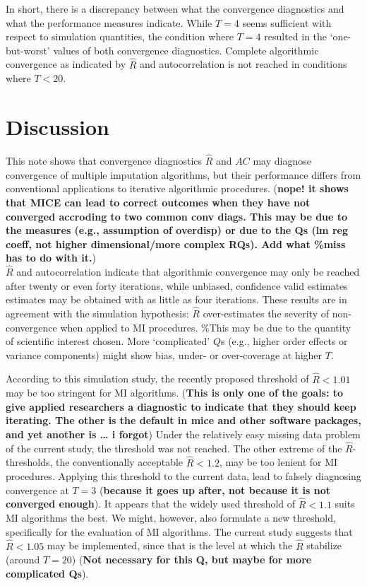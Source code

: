 \documentclass[Royal,times,sageh]{sagej}
\begin{document}
In short, there is a discrepancy between what the convergence
diagnostics and what the performance measures indicate. While \(T=4\)
seems sufficient with respect to simulation quantities, the condition
where \(T=4\) resulted in the `one-but-worst' values of both convergence
diagnostics. Complete algorithmic convergence as indicated by
\(\widehat{R}\) and autocorrelation is not reached in conditions where
\(T<20\).

\hypertarget{discussion}{%
\section{Discussion}\label{discussion}}

This note shows that convergence diagnostics \(\widehat{R}\) and \(AC\)
may diagnose convergence of multiple imputation algorithms, but their
performance differs from conventional applications to iterative
algorithmic procedures. (\textbf{nope! it shows that MICE can lead to
correct outcomes when they have not converged accroding to two common
conv diags. This may be due to the measures (e.g., assumption of
overdisp) or due to the Qs (lm reg coeff, not higher dimensional/more
complex RQs). Add what \%miss has to do with it.})\\
\(\widehat{R}\) and autocorrelation indicate that algorithmic
convergence may only be reached after twenty or even forty iterations,
while unbiased, confidence valid estimates estimates may be obtained
with as little as four iterations. These results are in agreement with
the simulation hypothesis: \(\widehat{R}\) over-estimates the severity
of non-convergence when applied to MI procedures. \%This may be due to
the quantity of scientific interest chosen. More `complicated' \(Q\)s
(e.g., higher order effects or variance components) might show bias,
under- or over-coverage at higher \(T\).

According to this simulation study, the recently proposed threshold of
\(\widehat{R}<1.01\) may be too stringent for MI algorithms.
(\textbf{This is only one of the goals: to give applied researchers a
diagnostic to indicate that they should keep iterating. The other is the
default in mice and other software packages, and yet another is \ldots{}
i forgot}) Under the relatively easy missing data problem of the current
study, the threshold was not reached. The other extreme of the
\(\widehat{R}\)-thresholds, the conventionally acceptable
\(\widehat{R} <1.2\), may be too lenient for MI procedures. Applying
this threshold to the current data, lead to falsely diagnosing
convergence at \(T = 3\) (\textbf{because it goes up after, not because
it is not converged enough}). It appears that the widely used threshold
of \(\widehat{R} < 1.1\) suits MI algorithms the best. We might,
however, also formulate a new threshold, specifically for the evaluation
of MI algorithms. The current study suggests that \(\widehat{R} < 1.05\)
may be implemented, since that is the level at which the \(\widehat{R}\)
stabilize (around \(T = 20\)) (\textbf{Not necessary for this Q, but
maybe for more complicated Qs}).
\end{document}
